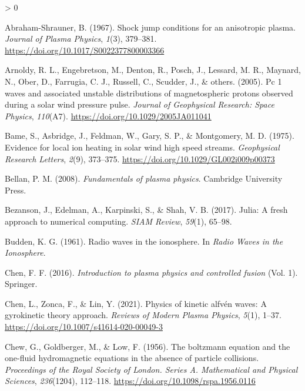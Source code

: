 \documentclass[
  notoc %
]{tufte-book}
\newlength{\cslhangindent}
\newenvironment{CSLReferences}[2] %
 {%
  \setlength{\parindent}{0pt}
  \ifodd #1 \everypar{\setlength{\hangindent}{\cslhangindent}}\ignorespaces\fi
  \ifnum #2 > 0
  \setlength{\parskip}{#2\baselineskip}
  \fi
 }%
 {}
\begin{document}
\hypertarget{refs}{}
\begin{CSLReferences}{1}{0}
\leavevmode\hypertarget{ref-abraham1967shock}{}%
Abraham-Shrauner, B. (1967). Shock jump conditions for an anisotropic
plasma. \emph{Journal of Plasma Physics}, \emph{1}(3), 379--381.
\url{https://doi.org/10.1017/S0022377800003366}

\leavevmode\hypertarget{ref-arnoldy2005pc}{}%
Arnoldy, R. L., Engebretson, M., Denton, R., Posch, J., Lessard, M. R.,
Maynard, N., Ober, D., Farrugia, C. J., Russell, C., Scudder, J., \&
others. (2005). Pc 1 waves and associated unstable distributions of
magnetospheric protons observed during a solar wind pressure pulse.
\emph{Journal of Geophysical Research: Space Physics}, \emph{110}(A7).
\url{https://doi.org/10.1029/2005JA011041}

\leavevmode\hypertarget{ref-bame1975evidence}{}%
Bame, S., Asbridge, J., Feldman, W., Gary, S. P., \& Montgomery, M. D.
(1975). Evidence for local ion heating in solar wind high speed streams.
\emph{Geophysical Research Letters}, \emph{2}(9), 373--375.
\url{https://doi.org/10.1029/GL002i009p00373}

\leavevmode\hypertarget{ref-bellan2008fundamentals}{}%
Bellan, P. M. (2008). \emph{Fundamentals of plasma physics}. Cambridge
University Press.

\leavevmode\hypertarget{ref-bezanson2017julia}{}%
Bezanson, J., Edelman, A., Karpinski, S., \& Shah, V. B. (2017). Julia:
A fresh approach to numerical computing. \emph{SIAM Review},
\emph{59}(1), 65--98.

\leavevmode\hypertarget{ref-budden1961radio}{}%
Budden, K. G. (1961). Radio waves in the ionosphere. In \emph{Radio
Waves in the Ionosphere}.

\leavevmode\hypertarget{ref-chen2016introduction}{}%
Chen, F. F. (2016). \emph{Introduction to plasma physics and controlled
fusion} (Vol. 1). Springer.

\leavevmode\hypertarget{ref-chen2021physics}{}%
Chen, L., Zonca, F., \& Lin, Y. (2021). Physics of kinetic alfvén waves:
A gyrokinetic theory approach. \emph{Reviews of Modern Plasma Physics},
\emph{5}(1), 1--37. \url{https://doi.org/10.1007/s41614-020-00049-3}

\leavevmode\hypertarget{ref-cgl1956}{}%
Chew, G., Goldberger, M., \& Low, F. (1956). The boltzmann equation and
the one-fluid hydromagnetic equations in the absence of particle
collisions. \emph{Proceedings of the Royal Society of London. Series A.
Mathematical and Physical Sciences}, \emph{236}(1204), 112--118.
\url{https://doi.org/10.1098/rspa.1956.0116}


\end{CSLReferences}
\end{document}
